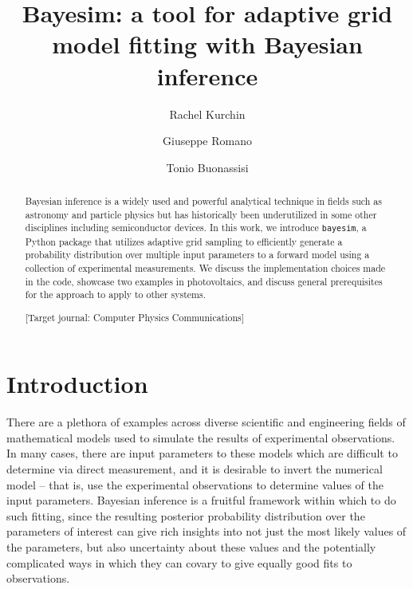 \documentclass[aps,prl,amsmath,amssymb,superscriptaddress,notitlepage,groupedaddress]{revtex4-1}
\begin{document}
\title{Bayesim: a tool for adaptive grid model fitting with Bayesian inference}

\author{Rachel Kurchin}
\author{Giuseppe Romano}
\author{Tonio Buonassisi}

\begin{abstract}
  Bayesian inference is a widely used and powerful analytical technique in fields such as astronomy and particle physics but has historically been underutilized in some other disciplines including semiconductor devices. In this work, we introduce \texttt{bayesim}, a Python package that utilizes adaptive grid sampling to efficiently generate a probability distribution over multiple input parameters to a forward model using a collection of experimental measurements. We discuss the implementation choices made in the code, showcase two examples in photovoltaics, and discuss general prerequisites for the approach to apply to other systems.

  [Target journal: Computer Physics Communications]
\end{abstract}

\maketitle

\section*{Introduction}
  There are a plethora of examples across diverse scientific and engineering fields of mathematical models used to simulate the results of experimental observations. In many cases, there are input parameters to these models which are difficult to determine via direct measurement, and it is desirable to invert the numerical model -- that is, use the experimental observations to determine values of the input parameters. Bayesian inference is a fruitful framework within which to do such fitting, since the resulting posterior probability distribution over the parameters of interest can give rich insights into not just the most likely values of the parameters, but also uncertainty about these values and the potentially complicated ways in which they can covary to give equally good fits to observations.
\end{document}
